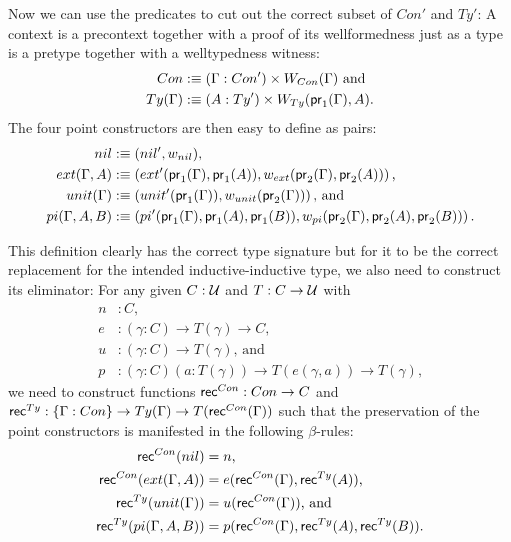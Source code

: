 Now we can use the predicates to cut out the correct subset of $Con'$ and
$Ty'$:
A context is a precontext together with a proof of its wellformedness just
as a type is a pretype together with a welltypedness witness:
\begin{align*}
Con &:\equiv (\Gamma : Con') \times W_{Con}(\Gamma) \text{ and}\\
Ty(\Gamma) &:\equiv (A : Ty') \times W_{Ty}(\mathsf{pr}_1(\Gamma), A) \text{.}
\end{align*}
The four point constructors are then easy to define as pairs:
\begin{align*}
nil &:\equiv (nil', w_{nil}) \text{,}\\
ext(\Gamma, A) &:\equiv \left(ext'(\mathsf{pr}_1(\Gamma),
    \mathsf{pr}_1(A)), w_{ext}(\mathsf{pr}_2(\Gamma), \mathsf{pr}_2(A)) \right) \text{,}\\
unit(\Gamma) &:\equiv \left(unit'(\mathsf{pr}_1(\Gamma)),
    w_{unit}(\mathsf{pr}_2(\Gamma)) \right) \text{, and}\\
pi(\Gamma, A, B) &:\equiv \left(pi'(\mathsf{pr}_1(\Gamma), \mathsf{pr}_1(A), \mathsf{pr}_1(B)),
   w_{pi}(\mathsf{pr}_2(\Gamma), \mathsf{pr}_2(A), \mathsf{pr}_2(B)) \right) \text{.}
\end{align*}

This definition clearly has the correct type signature but for it to be the correct
replacement for the intended inductive-inductive type,
we also need to construct its eliminator:
For any given $C : \mathcal{U}$ and $T : C \to \mathcal{U}$ with
\begin{align*}
n &: C \text{,} \\
e &: (\gamma : C) \to T(\gamma) \to C \text{,} \\
u &: (\gamma : C) \to T(\gamma) \text{, and} \\
p &: (\gamma : C) (a : T(\gamma)) \to T(e(\gamma, a)) \to T(\gamma) \text{,}
\end{align*}
we need to construct functions $\mathsf{rec}^{Con} : Con \to C$ and 
$\mathsf{rec}^{Ty} : \{\Gamma : Con\} \to Ty(\Gamma) \to T(\mathsf{rec}^{Con}(\Gamma))$ such
that the preservation of the point constructors is manifested in the
following $\beta$-rules:
\begin{align*}
\mathsf{rec}^{Con}(nil)
  &= n \text{,} \\
\mathsf{rec}^{Con}(ext(\Gamma, A))
  &= e(\mathsf{rec}^{Con}(\Gamma), \mathsf{rec}^{Ty}(A)) \text{,} \\
\mathsf{rec}^{Ty}(unit(\Gamma))
  &= u(\mathsf{rec}^{Con}(\Gamma)) \text{, and} \\
\mathsf{rec}^{Ty}(pi(\Gamma, A, B))
  &= p(\mathsf{rec}^{Con}(\Gamma), \mathsf{rec}^{Ty}(A), \mathsf{rec}^{Ty}(B)) \text{.}
\end{align*}

